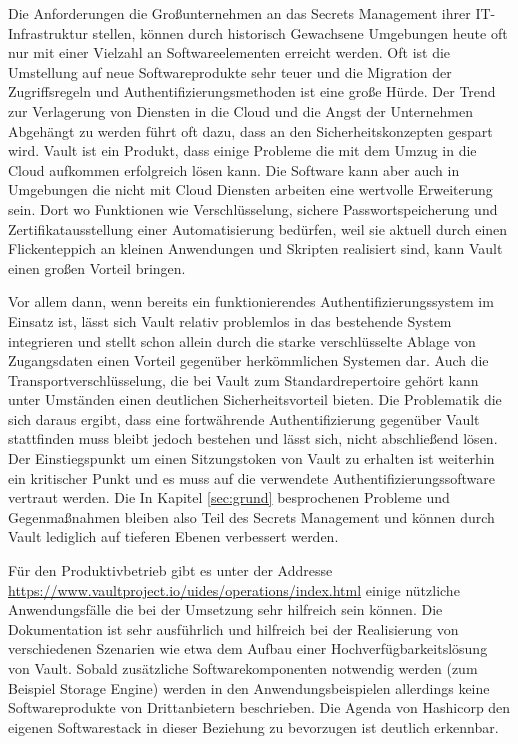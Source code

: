 \documentclass[
book,
a4paper,   
titlepage,  
halfparskip,
12pt        
]{scrartcl}
\begin{document}
\begin{onehalfspacing}
Die Anforderungen die Großunternehmen an das Secrets Management ihrer \ac{IT}-Infrastruktur stellen, können durch historisch Gewachsene Umgebungen heute oft nur mit einer Vielzahl an Softwareelementen erreicht werden. Oft ist die Umstellung auf neue Softwareprodukte sehr teuer und die Migration der Zugriffsregeln und Authentifizierungsmethoden ist eine große Hürde. Der Trend zur Verlagerung von Diensten in die Cloud und die Angst der Unternehmen Abgehängt zu werden führt oft dazu, dass an den Sicherheitskonzepten gespart wird. Vault ist ein Produkt, dass einige Probleme die mit dem Umzug in die Cloud aufkommen erfolgreich lösen kann. Die Software kann aber auch in Umgebungen die nicht mit Cloud Diensten arbeiten eine wertvolle Erweiterung sein. Dort wo Funktionen wie Verschlüsselung, sichere Passwortspeicherung und Zertifikatausstellung einer Automatisierung bedürfen, weil sie aktuell durch einen Flickenteppich an kleinen Anwendungen und Skripten realisiert sind, kann Vault einen großen Vorteil bringen.

Vor allem dann, wenn bereits ein funktionierendes Authentifizierungssystem im Einsatz ist, lässt sich Vault relativ problemlos in das bestehende System integrieren und stellt schon allein durch die starke verschlüsselte Ablage von Zugangsdaten einen Vorteil gegenüber herkömmlichen Systemen dar. Auch die Transportverschlüsselung, die bei Vault zum Standardrepertoire gehört kann unter Umständen einen deutlichen Sicherheitsvorteil bieten. 
Die Problematik die sich daraus ergibt, dass eine fortwährende Authentifizierung gegenüber Vault stattfinden muss bleibt jedoch bestehen und lässt sich, nicht abschließend lösen. Der Einstiegspunkt um einen Sitzungstoken von Vault zu erhalten ist weiterhin ein kritischer Punkt und es muss auf die verwendete Authentifizierungssoftware vertraut werden. Die In Kapitel \vref{sec:grund} besprochenen Probleme und Gegenmaßnahmen bleiben also Teil des Secrets Management und können durch Vault lediglich auf tieferen Ebenen verbessert werden.

Für den Produktivbetrieb gibt es unter der Addresse \url{https://www.vaultproject.io/uides/operations/index.html} einige nützliche Anwendungsfälle die bei der Umsetzung sehr hilfreich sein können. Die Dokumentation ist sehr ausführlich und hilfreich bei der Realisierung von verschiedenen Szenarien wie etwa dem Aufbau einer Hochverfügbarkeitslösung von Vault. Sobald zusätzliche Softwarekomponenten notwendig werden (zum Beispiel Storage Engine) werden in den Anwendungsbeispielen allerdings keine Softwareprodukte von Drittanbietern beschrieben. Die Agenda von Hashicorp den eigenen Softwarestack in dieser Beziehung zu bevorzugen ist deutlich erkennbar.


\end{onehalfspacing}
\end{document}
